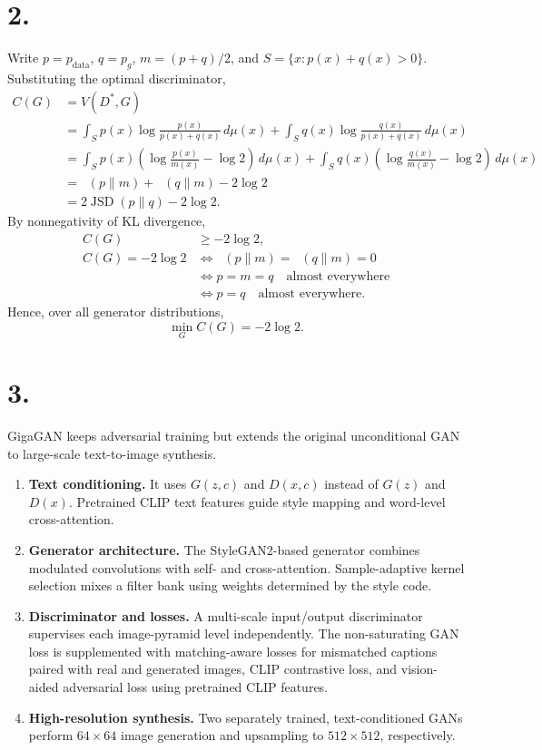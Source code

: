 \documentclass[11pt,a4paper]{article}
\DeclareMathOperator{\KL}{D_{\mathrm{KL}}}
\DeclareMathOperator{\JSD}{JSD}
\newcommand{\pdata}{p_{\mathrm{data}}}
\begin{document}
\clearpage
\section*{2.}

Write \(p=\pdata\), \(q=p_g\), \(m=(p+q)/2\), and
\(S=\{x:p(x)+q(x)>0\}\).
Substituting the optimal discriminator,
\[
\begin{aligned}
C(G)
&=V(D^*,G)\\
&=\int_S p(x)\log\frac{p(x)}{p(x)+q(x)}\,d\mu(x)
 +\int_S q(x)\log\frac{q(x)}{p(x)+q(x)}\,d\mu(x)\\
&=\int_S p(x)\left(\log\frac{p(x)}{m(x)}-\log2\right)\,d\mu(x)
 +\int_S q(x)\left(\log\frac{q(x)}{m(x)}-\log2\right)\,d\mu(x)\\
&=\KL(p\|m)+\KL(q\|m)-2\log2\\
&=\boxed{2\JSD(p\|q)-2\log2}.
\end{aligned}
\]
By nonnegativity of KL divergence,
\[
\begin{aligned}
C(G)&\ge-2\log2,\\
C(G)=-2\log2
&\iff \KL(p\|m)=\KL(q\|m)=0\\
&\iff p=m=q\quad\text{almost everywhere}\\
&\iff p=q\quad\text{almost everywhere}.
\end{aligned}
\]
Hence, over all generator distributions,
\[
\boxed{\min_G C(G)=-2\log2.}
\]

\section*{3.}

GigaGAN keeps adversarial training but extends the original
unconditional GAN to large-scale text-to-image synthesis.

\begin{enumerate}
\item \textbf{Text conditioning.}
It uses \(G(z,c)\) and \(D(x,c)\) instead of \(G(z)\) and \(D(x)\).
Pretrained CLIP text features guide style mapping and word-level
cross-attention.

\item \textbf{Generator architecture.}
The StyleGAN2-based generator combines modulated convolutions with
self- and cross-attention. Sample-adaptive kernel selection mixes a
filter bank using weights determined by the style code.

\item \textbf{Discriminator and losses.}
A multi-scale input/output discriminator supervises each image-pyramid
level independently. The non-saturating GAN loss is supplemented with
matching-aware losses for mismatched captions paired with real and
generated images, CLIP contrastive loss, and vision-aided adversarial
loss using pretrained CLIP features.

\item \textbf{High-resolution synthesis.}
Two separately trained, text-conditioned GANs perform \(64\times64\)
image generation and upsampling to \(512\times512\), respectively.
\end{enumerate}
\end{document}

